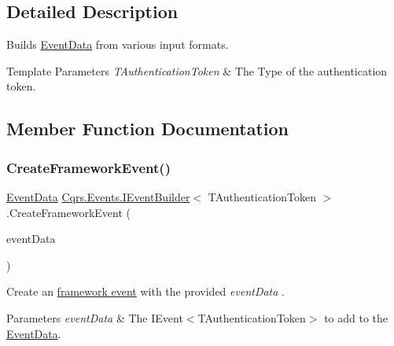\subsection{Detailed Description}
Builds \hyperlink{classCqrs_1_1Events_1_1EventData}{Event\+Data} from various input formats. 


\begin{DoxyTemplParams}{Template Parameters}
{\em T\+Authentication\+Token} & The Type of the authentication token.\\
\hline
\end{DoxyTemplParams}


\subsection{Member Function Documentation}
\mbox{\label{interfaceCqrs_1_1Events_1_1IEventBuilder_a3c0cb2db87e496ad64f481a6cce2c79d_a3c0cb2db87e496ad64f481a6cce2c79d}} 
\subsubsection{\texorpdfstring{Create\+Framework\+Event()}{CreateFrameworkEvent()}\hspace{0.1cm}{\footnotesize\ttfamily [1/2]}}
{\footnotesize\ttfamily \hyperlink{classCqrs_1_1Events_1_1EventData}{Event\+Data} \hyperlink{interfaceCqrs_1_1Events_1_1IEventBuilder}{Cqrs.\+Events.\+I\+Event\+Builder}$<$ T\+Authentication\+Token $>$.Create\+Framework\+Event (\begin{DoxyParamCaption}\item[{\hyperlink{interfaceCqrs_1_1Events_1_1IEvent}{I\+Event}$<$ T\+Authentication\+Token $>$}]{event\+Data }\end{DoxyParamCaption})}



Create an \hyperlink{}{framework event} with the provided {\itshape event\+Data} . 


\begin{DoxyParams}{Parameters}
{\em event\+Data} & The I\+Event$<$\+T\+Authentication\+Token$>$ to add to the \hyperlink{classCqrs_1_1Events_1_1EventData}{Event\+Data}.\\
\hline
\end{DoxyParams}



